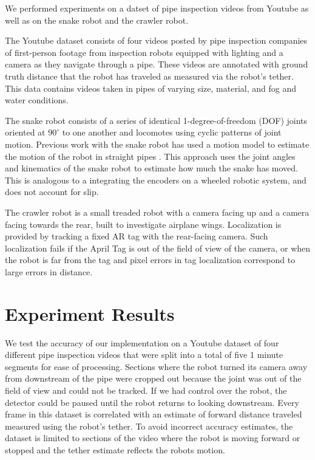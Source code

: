 \documentclass[letterpaper, 10 pt, conference]{ieeeconf}
\begin{document}
We performed experiments on a datset of pipe inspection videos from Youtube as well as on the snake robot and the crawler robot.

The Youtube dataset consists of four videos \cite{pipevideo2, pipevideo4, pipevideo5, pipevideo6} posted by pipe inspection companies of first-person footage from inspection robots equipped with lighting and a camera as they navigate through a pipe. These videos are annotated with ground truth distance that the robot has traveled as measured via the robot's tether. This data contains videos taken in pipes of varying size, material, and fog and water conditions.

The snake robot \cite{Wright2012} consists of a series of identical 1-degree-of-freedom (DOF) joints oriented at $90^{\circ}$ to one another and locomotes using cyclic patterns of joint motion. Previous work with the snake robot has used a motion model \cite{Enner2012} to estimate the motion of the robot in straight pipes \cite{Enner2013}. This approach uses the joint angles and kinematics of the snake robot to estimate how much the snake has moved. This is analogous to a integrating the encoders on a wheeled robotic system, and does not account for slip.

The crawler robot is a small treaded robot with a camera facing up and a camera facing towards the rear, built to investigate airplane wings. Localization is provided by tracking a fixed AR tag with the rear-facing camera. Such localization fails if the April Tag is out of the field of view of the camera, or when the robot is far from the tag and pixel errors in tag localization correspond to large errors in distance.

\section{Experiment Results}

We test the accuracy of our implementation on a Youtube dataset of four different pipe inspection videos that were split into a total of five 1 minute segments for ease of processing. Sections where the robot turned its camera away from downstream of the pipe were cropped out because the joint was out of the field of view and could not be tracked. If we had control over the robot, the detector could be paused until the robot returns to looking downstream. Every frame in this dataset is correlated with an estimate of forward distance traveled measured using the robot's tether. To avoid incorrect accuracy estimates, the dataset is limited to sections of the video where the robot is moving forward or stopped and the tether estimate reflects the robots motion.
\end{document}
